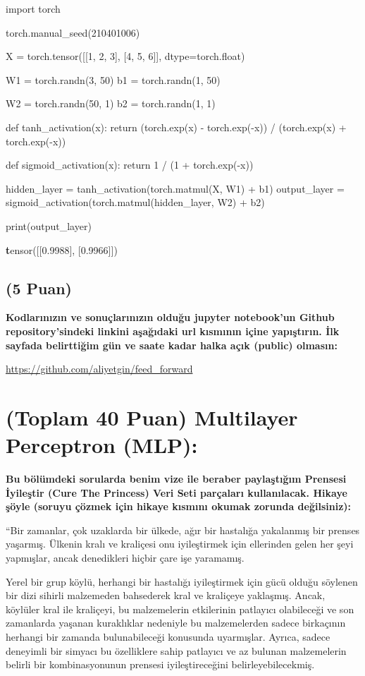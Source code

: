 \documentclass[11pt]{article}
\begin{document}
\begin{python}
import torch

torch.manual_seed(210401006)

X = torch.tensor([[1, 2, 3], [4, 5, 6]], dtype=torch.float)

W1 = torch.randn(3, 50)
b1 = torch.randn(1, 50)

W2 = torch.randn(50, 1)
b2 = torch.randn(1, 1)

def tanh_activation(x):
    return (torch.exp(x) - torch.exp(-x)) / (torch.exp(x) + torch.exp(-x))

def sigmoid_activation(x):
    return 1 / (1 + torch.exp(-x))

hidden_layer = tanh_activation(torch.matmul(X, W1) + b1)
output_layer = sigmoid_activation(torch.matmul(hidden_layer, W2) + b2)

print(output_layer)
\end{python}

\textbf tensor([[0.9988],
        [0.9966]])

\subsection{(5 Puan)} \textbf{Kodlarınızın ve sonuçlarınızın olduğu jupyter notebook'un Github repository'sindeki linkini aşağıdaki url kısmının içine yapıştırın. İlk sayfada belirttiğim gün ve saate kadar halka açık (public) olmasın:}

\url{https://github.com/aliyetgin/feed_forward}

\section{(Toplam 40 Puan) Multilayer Perceptron (MLP):} 
\textbf{Bu bölümdeki sorularda benim vize ile beraber paylaştığım Prensesi İyileştir (Cure The Princess) Veri Seti parçaları kullanılacak. Hikaye şöyle (soruyu çözmek için hikaye kısmını okumak zorunda değilsiniz):} 

``Bir zamanlar, çok uzaklarda bir ülkede, ağır bir hastalığa yakalanmış bir prenses yaşarmış. Ülkenin kralı ve kraliçesi onu iyileştirmek için ellerinden gelen her şeyi yapmışlar, ancak denedikleri hiçbir çare işe yaramamış.

Yerel bir grup köylü, herhangi bir hastalığı iyileştirmek için gücü olduğu söylenen bir dizi sihirli malzemeden bahsederek kral ve kraliçeye yaklaşmış. Ancak, köylüler kral ile kraliçeyi, bu malzemelerin etkilerinin patlayıcı olabileceği ve son zamanlarda yaşanan kuraklıklar nedeniyle bu malzemelerden sadece birkaçının herhangi bir zamanda bulunabileceği konusunda uyarmışlar. Ayrıca, sadece deneyimli bir simyacı bu özelliklere sahip patlayıcı ve az bulunan malzemelerin belirli bir kombinasyonunun prensesi iyileştireceğini belirleyebilecekmiş.
\end{document}
